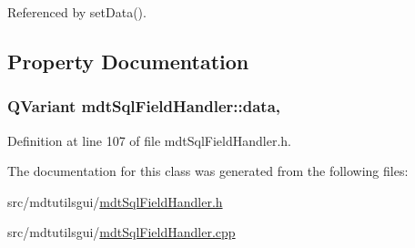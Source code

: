 Referenced by set\-Data().



\subsection{Property Documentation}
\hypertarget{classmdt_sql_field_handler_a87e0184853f31ac3236a6b05179192c8}{
\subsubsection[{data}]{\setlength{\rightskip}{0pt plus 5cm}Q\-Variant mdt\-Sql\-Field\-Handler\-::data\hspace{0.3cm}{\ttfamily [read]}, {\ttfamily [write]}}}\label{classmdt_sql_field_handler_a87e0184853f31ac3236a6b05179192c8}


Definition at line 107 of file mdt\-Sql\-Field\-Handler.\-h.



The documentation for this class was generated from the following files\-:\begin{DoxyCompactItemize}
\item 
src/mdtutilsgui/\hyperlink{mdt_sql_field_handler_8h}{mdt\-Sql\-Field\-Handler.\-h}\item 
src/mdtutilsgui/\hyperlink{mdt_sql_field_handler_8cpp}{mdt\-Sql\-Field\-Handler.\-cpp}\end{DoxyCompactItemize}
